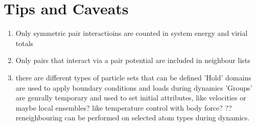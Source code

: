 \documentclass[a4paper,11pt]{scrbook}              %
\begin{document}
\chapter{Tips and Caveats}
\begin{enumerate}
\item Only symmetric pair interactioins are counted in system energy and virial totals
\item Only pairs that interact via a pair potential are included in neighbour lists
\item there are different types of particle sets that can be defined
  \subitem 'Hold' domains are used to apply boundary conditions and loads during dynamics
  \subitem 'Groups' are genrally temporary and used to set initial attributes, like velocities
     or maybe local ensembles? like temperature control with body force?
  \subitem ?? reneighbouring can be performed on selected atom types during dynamics.
\end{enumerate}



\end{document}
